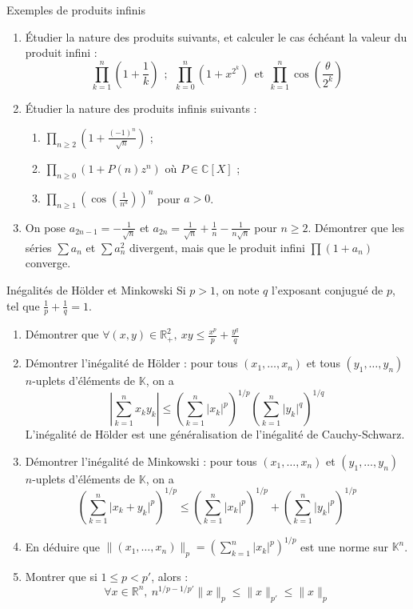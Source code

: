 \documentclass[french,a4paper]{article}
\newcommand{\R}{\mathbb{R}}
\newcommand{\C}{\mathbb{C}}
\newcommand{\K}{\mathbb{K}}
\theoremstyle{plain}
\theoremstyle{definition}
\theoremstyle{remark}
\begin{document}
\begin{ex}{Exemples de produits infinis}
	\begin{enumerate}
		\item Étudier la nature des produits suivants, et calculer le cas échéant la valeur du produit infini : $$\prod_{k=1}^{n}\left(1+\frac{1}{k}\right)\ \ ;\ \ \prod_{k=0}^{n}(1+x^{2^k}) \ \ \text{et}\ \ \prod_{k=1}^{n}\cos\left(\frac{\theta}{2^k}\right)$$
		\item Étudier la nature des produits infinis suivants :
		\begin{enumerate}[label=\alph*.]
			\item $\displaystyle\prod_{n\geqslant 2}\left(1+\frac{(-1)^n}{\sqrt{n}}\right)$ ;
			\item $\displaystyle\prod_{n\geqslant 0}\left(1+P(n)z^n\right)$ où $P\in\C[X]$ ;
			\item $\prod_{n\geqslant 1}\left(\cos\left(\frac{1}{n^a}\right)\right)^n$ pour $a>0$.
		\end{enumerate}
		\item On pose $a_{2n-1}=\displaystyle-\frac{1}{\sqrt{n}}$ et $a_{2n}=\displaystyle\frac{1}{\sqrt{n}}+\frac{1}{n}-\frac{1}{n\sqrt{n}}$ pour $n\geqslant 2$. Démontrer que les séries $\sum a_n$ et $\sum a_n^2$ divergent, mais que le produit infini $\prod(1+a_n)$ converge.
	\end{enumerate}
\end{ex}
\begin{ex}{Inégalités de Hölder et Minkowski}
	Si $p>1$, on note $q$ l'exposant conjugué de $p$, tel que $\displaystyle\frac{1}{p}+\frac{1}{q}=1$.
	\begin{enumerate}
		\item Démontrer que $\forall (x,y)\in\R_+^2,\ xy\leqslant\displaystyle\frac{x^p}{p}+\frac{y^q}{q}$
		\item Démontrer l'inégalité de Hölder : pour tous $(x_1,\ldots,x_n)$ et tous $(y_1,\ldots,y_n)$ $n$-uplets d'éléments de $\K$, on a $$\left\lvert\sum_{k=1}^nx_ky_k\right\rvert\leqslant\left(\sum_{k=1}^{n}\lvert x_k\rvert^p\right)^{1/p}\left(\sum_{k=1}^{n}\lvert y_k\rvert^q\right)^{1/q}$$
		L'inégalité de Hölder est une généralisation de l'inégalité de Cauchy-Schwarz.
		\item Démontrer l'inégalité de Minkowski : pour tous $(x_1,\ldots,x_n)$ et $(y_1,\ldots,y_n)$ $n$-uplets d'éléments de $\K$, on a $$\left(\sum_{k=1}^{n}\lvert x_k+y_k\rvert^p\right)^{1/p}\leqslant\left(\sum_{k=1}^{n}\lvert x_k\rvert^p\right)^{1/p}+\left(\sum_{k=1}^{n}\lvert y_k\rvert^p\right)^{1/p}$$
		\item En déduire que $\lVert (x_1,\ldots,x_n)\rVert_p=\left(\sum_{k=1}^{n}\lvert x_k\rvert^p\right)^{1/p}$ est une norme sur $\K^n$.
		\item Montrer que si $1\leqslant p<p'$, alors : $$\forall x\in\R^n,\ n^{1/p-1/p'}\lVert x\rVert_p\leqslant\lVert x\rVert_{p'}\leqslant\lVert x\rVert_p$$
	\end{enumerate}
\end{ex}
\end{document}
